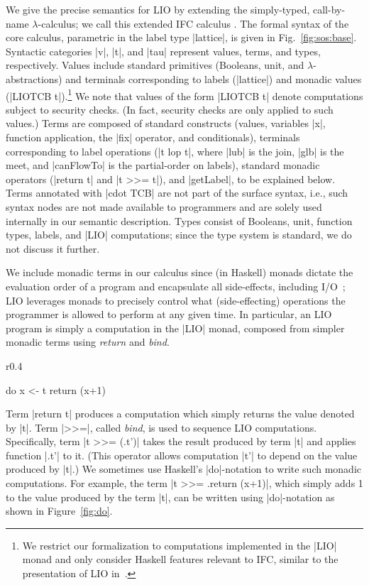 We give the precise semantics for LIO by extending the simply-typed,
call-by-name $\lambda$-calculus;
%
we call this extended IFC calculus \lio.
%
The formal syntax of the core \lio{} calculus, parametric in the label
type |lattice|, is given in Fig.~\ref{fig:sos:base}.
%
Syntactic categories |v|, |t|, and |tau| represent values, terms, and
types, respectively.
%
Values include standard primitives (Booleans, unit, and $\lambda$-abstractions)
and terminals corresponding to labels (|lattice|) and monadic values (|LIOTCB
t|).\footnote{ We restrict our formalization to computations implemented in the
  |LIO| monad and only consider Haskell features relevant to IFC, similar to the
  presentation of LIO in~\cite{stefan:lio,stefan:addressing-covert}.  } We note
that values of the form |LIOTCB t| denote computations subject to security
checks. (In fact, security checks are only applied to such values.)
%
Terms are composed of standard constructs (values, variables |x|, function
application, the |fix| operator, and conditionals), terminals corresponding to
label operations (|t lop t|, where |lub| is the join, |glb| is the meet, and
|canFlowTo| is the partial-order on labels), standard monadic operators (|return
t| and |t >>= t|), and |getLabel|, to be explained below.
%
Terms annotated with |cdot TCB| are not part of the surface syntax,
i.e., such syntax nodes are not made available to programmers and are
solely used internally in our semantic description.
%
Types consist of Booleans, unit, function types, labels, and |LIO|
computations; since the \lio{} type system is standard, we do not
discuss it further.

%
We include monadic terms in our calculus since (in Haskell) monads
dictate the evaluation order of a program and encapsulate all
side-effects, including I/O~\cite{moggi:monads, wadler:monads};
%
LIO leverages monads to precisely control what (side-effecting)
operations the programmer is allowed to perform at any given time.
%
In particular, an LIO program is simply a computation in the |LIO| monad,
composed from simpler monadic terms using \emph{return} and \emph{bind}.
%
\begin{wrapfigure}{r}{0.4\columnwidth}
\vspace{-15pt}
\begin{code}
do  x <- t 
    return (x+1) 
\end{code}
\vspace{-15pt}
\caption{\small\label{fig:do}|do|-notation}
\end{wrapfigure}
%
Term |return t| produces a computation which simply returns the value
denoted by |t|. Term |>>=|, called \emph{bind}, is used to sequence
LIO computations. Specifically, term |t >>= (\x.t')| takes the result
produced by term |t| and applies function |\x.t'| to it.  (This
operator allows computation |t'| to depend on the value produced by
|t|.)  We sometimes use Haskell’s |do|-notation to write such monadic
computations. For example, the term |t >>= \x.return (x+1)|, which
simply adds 1 to the value produced by the term |t|, can be written
using |do|-notation as shown in Figure~\ref{fig:do}.

